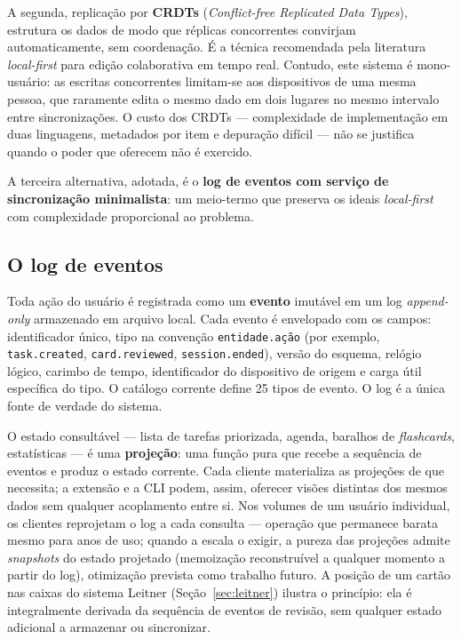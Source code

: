 \documentclass[12pt, %
openright, 
oneside,
a4paper,
english,   %
brazil]{facom-ufu-abntex2}
\begin{document}
A segunda, replicação por \textbf{CRDTs} (\textit{Conflict-free Replicated
Data Types}), estrutura os dados de modo que réplicas concorrentes convirjam
automaticamente, sem coordenação. É a técnica recomendada pela literatura
\textit{local-first} para edição colaborativa em tempo real. Contudo, este
sistema é mono-usuário: as escritas concorrentes limitam-se aos dispositivos de
uma mesma pessoa, que raramente edita o mesmo dado em dois lugares no mesmo
intervalo entre sincronizações. O custo dos CRDTs --- complexidade de
implementação em duas linguagens, metadados por item e depuração difícil ---
não se justifica quando o poder que oferecem não é exercido.

A terceira alternativa, adotada, é o \textbf{log de eventos com serviço de
sincronização minimalista}: um meio-termo que preserva os ideais
\textit{local-first} com complexidade proporcional ao problema.

\subsection{O log de eventos}

Toda ação do usuário é registrada como um \textbf{evento} imutável em um log
\textit{append-only} armazenado em arquivo local. Cada evento é envelopado com
os campos: identificador único, tipo na convenção \texttt{entidade.ação} (por
exemplo, \texttt{task.created}, \texttt{card.reviewed},
\texttt{session.ended}), versão do esquema, relógio lógico, carimbo de tempo,
identificador do dispositivo de origem e carga útil específica do tipo. O
catálogo corrente define 25 tipos de evento. O log é a única fonte de verdade
do sistema.

O estado consultável --- lista de tarefas priorizada, agenda, baralhos de
\textit{flashcards}, estatísticas --- é uma \textbf{projeção}: uma função pura
que recebe a sequência de eventos e produz o estado corrente. Cada cliente
materializa as projeções de que necessita; a extensão e a CLI podem, assim,
oferecer visões distintas dos mesmos dados sem qualquer acoplamento entre si.
Nos volumes de um usuário individual, os clientes reprojetam o log a cada
consulta --- operação que permanece barata mesmo para anos de uso; quando a
escala o exigir, a pureza das projeções admite \textit{snapshots} do estado
projetado (memoização reconstruível a qualquer momento a partir do log),
otimização prevista como trabalho futuro. A posição de um cartão nas caixas do sistema
Leitner (Seção~\ref{sec:leitner}) ilustra o princípio: ela é integralmente
derivada da sequência de eventos de revisão, sem qualquer estado adicional a
armazenar ou sincronizar.
\end{document}
